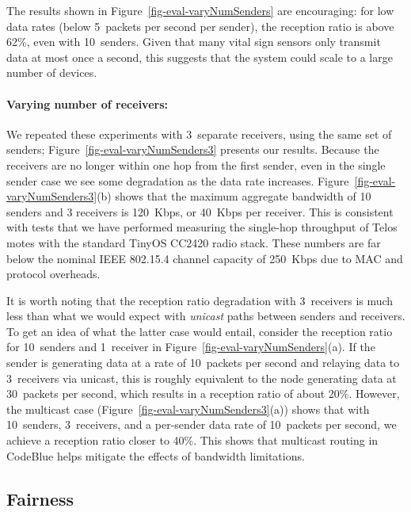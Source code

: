 The results shown in Figure~\ref{fig-eval-varyNumSenders} are
encouraging: for low data rates (below 5~packets per second per
sender), the reception ratio is above 62\%, even with
10~senders. Given that many vital sign sensors only transmit data at
most once a second, this suggests that the system could scale to a
large number of devices.

\paragraph*{Varying number of receivers:}
We repeated these experiments with 3~separate receivers, using the
same set of senders; Figure~\ref{fig-eval-varyNumSenders3} presents
our results. Because the receivers are no longer within one hop from
the first sender, even in the single sender case we see some
degradation as the data rate increases.
Figure~\ref{fig-eval-varyNumSenders3}(b) shows that the maximum
aggregate bandwidth of 10 senders and 3 receivers is 120~Kbps, or
40~Kbps per receiver. This is consistent with tests that we have
performed measuring the single-hop throughput of Telos motes with the
standard TinyOS CC2420 radio stack. These numbers are far below the
nominal IEEE 802.15.4 channel capacity of 250~Kbps due to MAC and protocol
overheads.

It is worth noting that the reception ratio degradation 
with 3~receivers is much less than what we would expect with
{\em unicast} paths between senders and receivers. 
To get an idea of what the latter case would entail,
consider the reception ratio for 10~senders and 1~receiver in
Figure~\ref{fig-eval-varyNumSenders}(a).
If the sender is generating data at a rate of 10~packets per second and 
relaying data to 3~receivers via unicast, this is roughly equivalent 
to the node generating data at 30~packets per second, 
which results in a reception ratio of about 20\%. However,
the multicast case (Figure~\ref{fig-eval-varyNumSenders3}(a))
shows that with 10~senders, 3~receivers, and a per-sender data 
rate of 10~packets per second, we achieve a reception ratio closer to 40\%. 
This shows that multicast routing in CodeBlue helps mitigate the effects of 
bandwidth limitations.

\subsection{Fairness}


